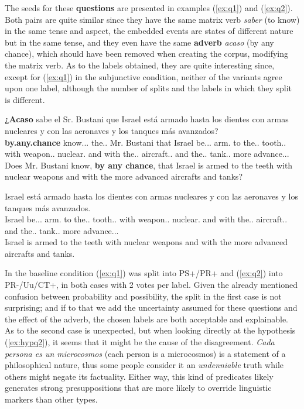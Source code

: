 The seeds for these \textbf{questions} are presented in examples (\ref{ex:q1}) and (\ref{ex:q2}). Both pairs are quite similar since they have the same matrix verb \textit{saber} (to know) in the same tense and aspect, the embedded events are states of different nature but in the same tense, and they even have the same \textbf{adverb} \textit{acaso} (by any chance), which should have been removed when creating the corpus, modifying the matrix verb. As to the labels obtained, they are quite interesting since, except for (\ref{ex:q1}) in the subjunctive condition, neither of the variants agree upon one label, although the number of splits and the labels in which they split is different.\\

\begin{exe}
  \ex\label{ex:q1}
    \begin{xlist}
      \item{\gll \textbf{¿Acaso} sabe el Sr. Bustani que Israel está armado hasta los dientes con armas nucleares y con las aeronaves y los tanques más avanzados?\\ \textbf{by.any.chance} know.\Prs.\Ind.\Tsg{} the.\M.\Sg{} Mr. Bustani that Israel be.\Prs.\Ind.\Tsg{} arm.\Ptcp{} to the.\M.\Pl{} tooth.\M.\Pl{} with weapon.\F.\Sg{} nuclear.\Pl{} and with the.\F.\Pl{} aircraft.\F.\Pl{} and the.\M.\Pl{} tank.\M.\Pl{} more advance.\Ptcp.\M.\Pl{} \\\glt Does Mr. Bustani know, \textbf{by any chance}, that Israel is armed to the teeth with nuclear weapons and with the more advanced aircrafts and tanks?}
      \item{\gll Israel está armado hasta los dientes con armas nucleares y con las aeronaves y los tanques más avanzados.\\ Israel be.\Prs.\Ind.\Tsg{} arm.\Ptcp{} to the.\M.\Pl{} tooth.\M.\Pl{} with weapon.\F.\Sg{} nuclear.\Pl{} and with the.\F.\Pl{} aircraft.\F.\Pl{} and the.\M.\Pl{} tank.\M.\Pl{} more advance.\Ptcp.\M.\Pl{}\\\glt Israel is armed to the teeth with nuclear weapons and with the more advanced aircrafts and tanks.} \label{ex:hypq1}
    \end{xlist}
\end{exe}

In the baseline condition (\ref{ex:q1}) was split into PS+/PR+ and (\ref{ex:q2}) into PR-/Uu/CT+, in both cases with 2 votes per label. Given the already mentioned confusion between probability and possibility, the split in the first case is not surprising; and if to that we add the uncertainty assumed for these questions and the effect of the adverb, the chosen labels are both acceptable and explainable. As to the second case is unexpected, but when looking directly at the hypothesis (\ref{ex:hypq2}), it seems that it might be the cause of the disagreement. \textit{Cada persona es un microcosmos} (each person is a microcosmos) is a statement of a philosophical nature, thus some people consider it an \textit{undenniable} truth while others might negate its factuality. Either way, this kind of predicates likely generates strong presuppositions that are more likely to override linguistic markers than other types.\\

